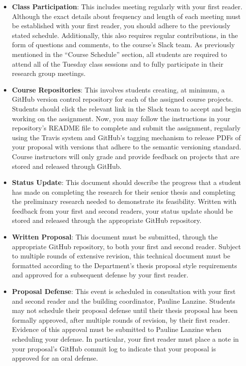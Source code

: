 \documentclass[11pt]{article}
\begin{document}
\begin{itemize}
  \itemsep -.25em

  \item {\bf Class Participation}: This includes meeting regularly with your
    first reader. Although the exact details about frequency and length of each
    meeting must be established with your first reader, you should adhere to the
    previously stated schedule. Additionally, this also requires regular
    contributions, in the form of questions and comments, to the course's Slack
    team. As previously mentioned in the ``Course Schedule'' section, all
    students are required to attend all of the Tuesday class sessions and to
    fully participate in their research group meetings.

  \item {\bf Course Repositories}: This involves students creating, at minimum,
    a GitHub version control repository for each of the assigned course
    projects. Students should click the relevant link in the Slack team to
    accept and begin working on the assignment. Now, you may follow the
    instructions in your repository's README file to complete and submit the
    assignment, regularly using the Travis system and GitHub's tagging mechanism
    to release PDFs of your proposal with versions that adhere to the semantic
    versioning standard. Course instructors will only grade and provide feedback
    on projects that are stored and released through GitHub.

  \item {\bf Status Update}: This document should describe the progress that a
    student has made on completing the research for their senior thesis and
    completing the preliminary research needed to demonstrate its feasibility.
    Written with feedback from your first and second readers, your status update
    should be stored and released through the appropriate GitHub repository.

  \item {\bf Written Proposal}: This document must be submitted, through the
    appropriate GitHub repository, to both your first and second reader. Subject
    to multiple rounds of extensive revision, this technical document must be
    formatted according to the Department's thesis proposal style requirements
    and approved for a subsequent defense by your first reader.

  \item {\bf Proposal Defense}: This event is scheduled in consultation with
    your first and second reader and the building coordinator, Pauline Lanzine.
    Students may not schedule their proposal defense until their thesis proposal
    has been formally approved, after multiple rounds of revision, by their
    first reader. Evidence of this approval must be submitted to Pauline Lanzine
    when scheduling your defense. In particular, your first reader must place a
    note in your proposal's GitHub commit log to indicate that your proposal is
    approved for an oral defense.


\end{itemize}
\end{document}
